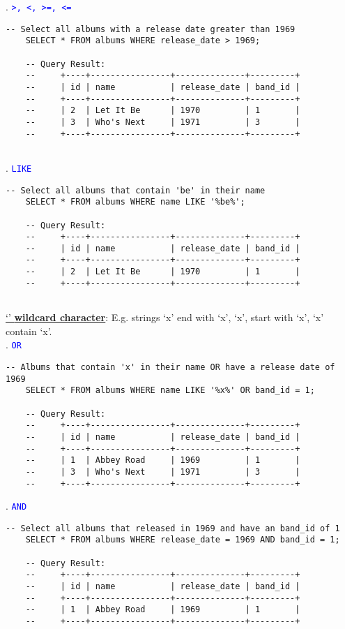 . \textcolor{blue}{\texttt{>, <, >=, <=}}
\begin{lstlisting}[style=sql]
    -- Select all albums with a release date greater than 1969
    SELECT * FROM albums WHERE release_date > 1969;

    -- Query Result:
    --     +----+----------------+--------------+---------+
    --     | id | name           | release_date | band_id |
    --     +----+----------------+--------------+---------+
    --     | 2  | Let It Be      | 1970         | 1       |
    --     | 3  | Who's Next     | 1971         | 3       |
    --     +----+----------------+--------------+---------+
    
\end{lstlisting}

. \textcolor{blue}{\texttt{LIKE}}
\begin{lstlisting}[style=sql]
    -- Select all albums that contain 'be' in their name
    SELECT * FROM albums WHERE name LIKE '%be%';

    -- Query Result:
    --     +----+----------------+--------------+---------+
    --     | id | name           | release_date | band_id |
    --     +----+----------------+--------------+---------+
    --     | 2  | Let It Be      | 1970         | 1       |
    --     +----+----------------+--------------+---------+
    
\end{lstlisting}

\noindent
\underline{`\bt{\%}' \textbf{wildcard character}}: E.g. strings `\bt{\%}x' end with `x', `x\bt{\%}', start with `x', `\bt{\%}x\bt{\%}' contain `x'.\\

. \textcolor{blue}{\texttt{OR}}
\begin{lstlisting}[style=sql]
    -- Albums that contain 'x' in their name OR have a release date of 1969 
    SELECT * FROM albums WHERE name LIKE '%x%' OR band_id = 1;

    -- Query Result:
    --     +----+----------------+--------------+---------+
    --     | id | name           | release_date | band_id |
    --     +----+----------------+--------------+---------+
    --     | 1  | Abbey Road     | 1969         | 1       |
    --     | 3  | Who's Next     | 1971         | 3       |
    --     +----+----------------+--------------+---------+
\end{lstlisting}

\newpage

. \textcolor{blue}{\texttt{AND}}
\begin{lstlisting}[style=sql]
    -- Select all albums that released in 1969 and have an band_id of 1
    SELECT * FROM albums WHERE release_date = 1969 AND band_id = 1;

    -- Query Result:
    --     +----+----------------+--------------+---------+
    --     | id | name           | release_date | band_id |
    --     +----+----------------+--------------+---------+
    --     | 1  | Abbey Road     | 1969         | 1       |
    --     +----+----------------+--------------+---------+
\end{lstlisting}


